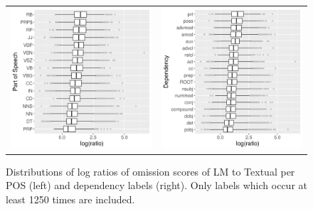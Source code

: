 \begin{figure}[t]
  \centering
  \hspace*{-0.2in}
  \setlength{\tabcolsep}{0pt}
  \begin{tabular}{cc}
  \includegraphics[scale=0.55]{chapters/COLI/imaginet-omission-quotient-pos-boxplot.png} &
  \includegraphics[scale=0.55]{chapters/COLI/imaginet-omission-quotient-dep-boxplot.png} \\
  \end{tabular}
  \caption{Distributions of log ratios of omission scores of {\sc LM} to {\sc Textual} per
    POS (left) and dependency labels (right). Only labels which occur at least 1250 times are included.}
\label{fig:omission-imaginet-quotient}
\end{figure}


